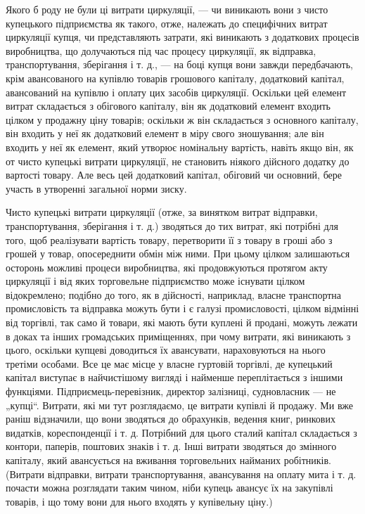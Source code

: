 
Якого б роду не були ці витрати циркуляції, — чи виникають
вони з чисто купецького підприємства як такого, отже, належать
до специфічних витрат циркуляції купця, чи представляють
затрати, які виникають з додаткових процесів виробництва, що
долучаються під час процесу циркуляції, як відправка, транспортування,
зберігання і т. д., — на боці купця вони завжди передбачають,
крім авансованого на купівлю товарів грошового капіталу,
додатковий капітал, авансований на купівлю і оплату цих
засобів циркуляції. Оскільки цей елемент витрат складається
з обігового капіталу, він як додатковий елемент входить цілком
у продажну ціну товарів; оскільки ж він складається з основного
капіталу, він входить у неї як додатковий елемент в міру
свого зношування; але він входить у неї як елемент, який утворює
номінальну вартість, навіть якщо він, як от чисто купецькі
витрати циркуляції, не становить ніякого дійсного додатку до
вартості товару. Але весь цей додатковий капітал, обіговий
чи основний, бере участь в утворенні загальної норми зиску.

Чисто купецькі витрати циркуляції (отже, за винятком витрат
відправки, транспортування, зберігання і т. д.) зводяться до тих
витрат, які потрібні для того, щоб реалізувати вартість товару,
перетворити її з товару в гроші або з грошей у товар, опосереднити
обмін між ними. При цьому цілком залишаються осторонь
можливі процеси виробництва, які продовжуються протягом
акту циркуляції і від яких торговельне підприємство може
існувати цілком відокремлено; подібно до того, як в дійсності,
наприклад, власне транспортна промисловість та відправка можуть
бути і є галузі промисловості, цілком відмінні від торгівлі,
так само й товари, які мають бути куплені й продані,
можуть лежати в доках та інших громадських приміщеннях, при
чому витрати, які виникають з цього, оскільки купцеві доводиться
їх авансувати, нараховуються на нього третіми особами.
Все це має місце у власне гуртовій торгівлі, де купецький
капітал виступає в найчистішому вигляді і найменше переплітається
з іншими функціями. Підприємець-перевізник, директор
залізниці, судновласник — не „купці“. Витрати, які ми тут розглядаємо,
це витрати купівлі й продажу. Ми вже раніш відзначили,
що вони зводяться до обрахунків, ведення книг, ринкових
видатків, кореспонденції і т. д. Потрібний для цього сталий
капітал складається з контори, паперів, поштових знаків
і т. д. Інші витрати зводяться до змінного капіталу, який авансується
на вживання торговельних найманих робітників. (Витрати
відправки, витрати транспортування, авансування на оплату
мита і т. д. почасти можна розглядати таким чином, ніби купець
авансує їх на закупівлі товарів, і що тому вони для нього входять
у купівельну ціну.)

